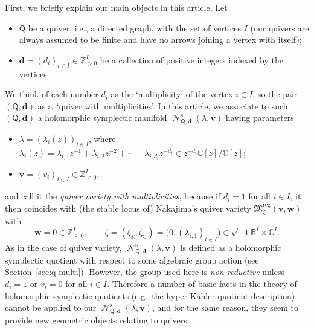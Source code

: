 \documentclass[pdftex]{sigma}
\numberwithin{equation}{section}
\theoremstyle{definition}
\newcommand{\secref}[1]{Section~\ref{#1}}
\newcommand{\Z}{\mathbb{Z}} %
\newcommand{\R}{\mathbb{R}} %
\newcommand{\C}{\mathbb{C}} %
\newcommand{\bv}{\mathbf{v}}
\newcommand{\bw}{\mathbf{w}}
\newcommand{\ved}{\mathbf{d}}
\newcommand{\Qst}{\operatorname{\mathscr{N}}^\mathrm{s}}
\newcommand{\QQ}{\mathsf{Q}} %
\begin{document}
First, we brief\/ly explain our main objects in this article.
Let
\begin{itemize}\itemsep=0pt
\item $\QQ$ be a quiver, i.e., a directed graph,
with the set of vertices $I$
(our quivers are always assumed to be f\/inite
and have no arrows joining a vertex with itself);
\item $\ved =(d_i)_{i \in I} \in \Z_{>0}^I$ be
a collection of positive integers indexed by the vertices.
\end{itemize}
We think of each number $d_i$ as the `multiplicity' of the vertex $i \in I$,
so the pair $(\QQ,\ved)$ as a~`quiver with multiplicities'.
In this article,
we associate to such $(\QQ,\ved)$ a holomorphic symplectic manifold
$\Qst_{\QQ,\ved}(\lambda,\bv)$ having parameters
\begin{itemize}\itemsep=0pt
\item $\lambda=(\lambda_i(z))_{i \in I}$, where
$\lambda_i(z)=\lambda_{i,1}z^{-1} + \lambda_{i,2}z^{-2}
+ \cdots + \lambda_{i,d_i}z^{-d_i} \in z^{-d_i}\C[z]/\C[z]$;
\item $\bv=(v_i)_{i \in I} \in \Z_{\geq 0}^I$,
\end{itemize}
and call it the {\em quiver variety with multiplicities},
because if $d_i=1$ for all $i \in I$,
it then coincides with (the stable locus of)
Nakajima's quiver variety
$\mathfrak{M}^\mathrm{reg}_\zeta(\bv,\bw)$ \cite{MR1302318} with
\[
\bw=0 \in \Z_{\geq 0}^I, \qquad
\zeta=(\zeta_\R,\zeta_\C)=\bigl( 0,(\lambda_{i,1})_{i \in I} \bigr)
\in \sqrt{-1}\R^I \times \C^I.
\]
As in the case of quiver variety,
$\Qst_{\QQ,\ved}(\lambda,\bv)$ is def\/ined as
a holomorphic symplectic quotient
with respect to some algebraic group action (see \secref{sec:q-multi}).
However, the group used here is {\em non-reductive}
unless $d_i=1$ or $v_i=0$ for all $i \in I$.
Therefore a number of basic facts
in the theory of holomorphic symplectic quotients
(e.g.\ the hyper-K\"ahler quotient description) cannot be applied to our
$\Qst_{\QQ,\ved}(\lambda,\bv)$,
and for the same reason,
they seem to provide new geometric objects relating to quivers.
\end{document}
